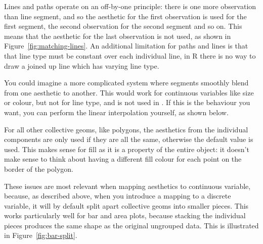 Lines and paths operate on an off-by-one principle: there is one more observation than line segment, and so the aesthetic for the first observation is used for the first segment, the second observation for the second segment and so on.  This means that the aesthetic for the last observation is not used, as shown in Figure~\ref{fig:matching-lines}.  An additional limitation for paths and lines is that that line type must be constant over each individual line, in R there is no way to draw a joined up line which has varying line type.

% 


You could imagine a more complicated system where segments smoothly blend from one aesthetic to another.  This would work for continuous variables like size or colour, but not for line type, and is not used in \ggplot.  If this is the behaviour you want, you can perform the linear interpolation yourself, as shown below.  

% 


For all other collective geoms, like polygons, the aesthetics from the individual components are only used if they are all the same, otherwise the default value is used.  This makes sense for fill as it is a property of the entire object: it doesn't make sense to think about having a different fill colour for each point on the border of the polygon.

These issues are most relevant when mapping aesthetics to continuous variable, because, as described above, when you introduce a mapping to a discrete variable, it will by default split apart collective geoms into smaller pieces.  This works particularly well for bar and area plots, because stacking the individual pieces produces the same shape as the original ungrouped data.  This is illustrated in Figure~\ref{fig:bar-split}.

